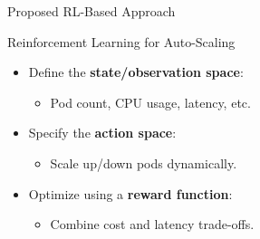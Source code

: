 \documentclass{beamer}
\begin{document}
\begin{frame}{Proposed RL-Based Approach}
    \begin{block}{Reinforcement Learning for Auto-Scaling}
        \begin{itemize}
            \item Define the \textbf{state/observation space}:
            \begin{itemize}
                \item Pod count, CPU usage, latency, etc.
            \end{itemize}
            \item Specify the \textbf{action space}:
            \begin{itemize}
                \item Scale up/down pods dynamically.
            \end{itemize}
            \item Optimize using a \textbf{reward function}:
            \begin{itemize}
                \item Combine cost and latency trade-offs.
            \end{itemize}
        \end{itemize}
    \end{block}

\end{frame}
\end{document}
